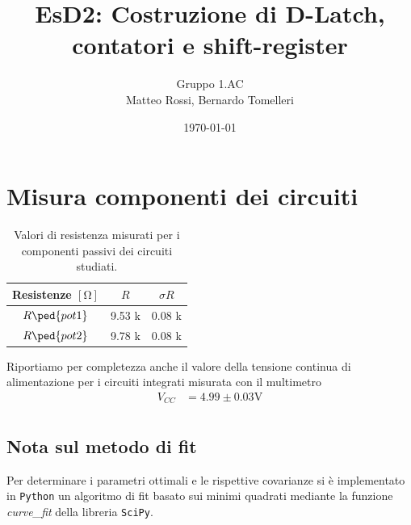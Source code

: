 \documentclass[10pt, a4paper, italian]{article}
\author{Gruppo 1.AC \\ Matteo Rossi, Bernardo Tomelleri}
\title{EsD2: Costruzione di D-Latch, contatori e shift-register}
\begin{document}
\date{\today}
\maketitle

\section*{Misura componenti dei circuiti}
\begin{table}[htbp]
\centering
\begin{tabular}{ccc}
\toprule
Resistenze $[\si{\ohm}]$ & $R$ & $\sigma R$ \\
\midrule
\midrule
$R\ped{pot1}$	& 9.53 k	& 0.08 k 		\\
$R\ped{pot2}$	& 9.78 k	& 0.08 k 		\\

\bottomrule     
\end{tabular}
\caption{Valori di resistenza misurati per i componenti passivi dei circuiti
studiati. \label{tab: rmesM}}
\end{table}

Riportiamo per completezza anche il valore della tensione continua di
alimentazione per i circuiti integrati misurata con il multimetro
\begin{align*}
V_{CC} &= 4.99 \pm 0.03 \si{\V} \\
\end{align*}

\subsection*{Nota sul metodo di fit}
Per determinare i parametri ottimali e le rispettive covarianze si \`e
implementato in \verb+Python+ un algoritmo di fit basato sui minimi quadrati
mediante la funzione \emph{curve\_fit} della libreria \texttt{SciPy}.

\setcounter{section}{0}
\end{document}
